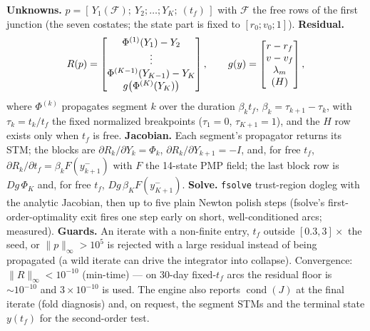 \documentclass[11pt]{article}
\newcommand{\tf}{t_f}\newcommand{\R}{\mathbb{R}}
\begin{document}
\begin{rig}
\textbf{Unknowns.} $p=[\,Y_1(\mathcal F);\ Y_2;\dots;Y_K;\ (\tf)\,]$ with $\mathcal F$ the
free rows of the first junction (the seven costates; the state part is fixed to
$[r_0;v_0;1]$). \textbf{Residual.}
\begin{equation}\label{eq:msres}
R(p)=\begin{bmatrix}\Phi^{(1)}(Y_1)-Y_2\\ \vdots\\ \Phi^{(K-1)}(Y_{K-1})-Y_K\\ g\big(\Phi^{(K)}(Y_K)\big)\end{bmatrix},
\qquad
g(y)=\begin{bmatrix} r-r_f\\ v-v_f\\ \lambda_m\\ (H)\end{bmatrix},
\end{equation}
where $\Phi^{(k)}$ propagates segment $k$ over the duration $\beta_k\tf$, $\beta_k=\tau_{k+1}-\tau_k$, with $\tau_k=t_k/\tf$ the fixed normalized breakpoints ($\tau_1=0$, $\tau_{K+1}=1$), and the $H$ row exists only when $\tf$ is free.
\textbf{Jacobian.} Each segment's propagator returns its STM; the blocks are
$\partial R_k/\partial Y_k=\Phi_k$, $\partial R_k/\partial Y_{k+1}=-I$, and, for free
$\tf$, $\partial R_k/\partial\tf=\beta_k F(y_{k+1}^-)$ with $F$ the 14-state PMP field; the last block row is $Dg\,\Phi_K$ and, for free $\tf$, $Dg\,\beta_K F(y_{K+1}^-)$. \textbf{Solve.} \texttt{fsolve}
trust-region dogleg with the analytic Jacobian, then up to five plain Newton
polish steps (fsolve's first-order-optimality exit fires one step early on
short, well-conditioned arcs; measured). \textbf{Guards.} An iterate with a
non-finite entry, $\tf$ outside $[0.3,3]\times$ the seed, or $\|p\|_\infty>10^5$
is rejected with a large residual instead of being propagated (a wild iterate
can drive the integrator into collapse). Convergence: $\|R\|_\infty<10^{-10}$
(min-time) --- on 30-day fixed-$\tf$ arcs the residual floor is $\sim10^{-10}$ and
$3\times10^{-10}$ is used. The engine also reports $\operatorname{cond}(J)$ at
the final iterate (fold diagnosis) and, on request, the segment STMs and the
terminal state $y(\tf)$ for the second-order test.
\end{rig}
\end{document}
